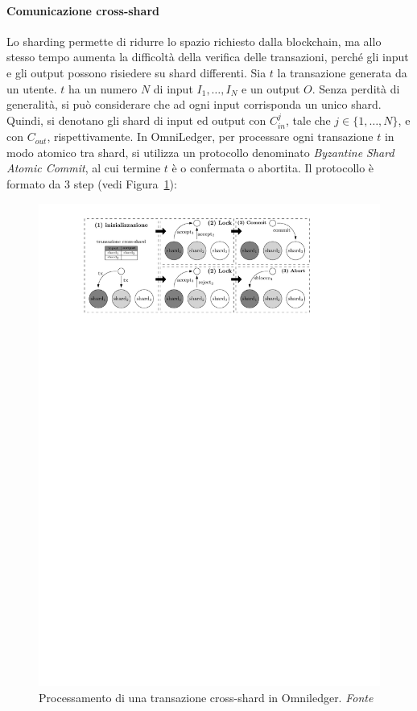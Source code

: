\paragraph*{Comunicazione cross-shard}
Lo sharding permette di ridurre lo spazio richiesto dalla blockchain, ma allo stesso tempo aumenta la difficoltà della verifica delle transazioni, perché gli input e gli output possono risiedere su shard differenti. Sia $t$ la transazione generata da un utente. $t$ ha un numero $N$ di input $I_1, \dots, I_N$ e un output $O$. Senza perdità di generalità, si può considerare che ad ogni input corrisponda un unico shard. Quindi, si denotano gli shard di input ed output con $C_{in}^j$, tale che $j \in \{1, \dots, N\}$, e con $C_{out}$, rispettivamente. 
In OmniLedger, per processare ogni transazione $t$ in modo atomico tra shard, si utilizza un protocollo denominato \emph{Byzantine Shard Atomic Commit}, al cui termine $t$ è o confermata o abortita. Il protocollo è formato da 3 step (vedi Figura~\ref{fig:atomix}):

\begin{figure}
	\centering
	\includegraphics[scale=0.9]{img/capdue/atomix.pdf}
	\caption{Processamento di una transazione cross-shard in Omniledger. \emph{Fonte~\cite{kokoris2018omniledger}}}
	\label{fig:atomix}
\end{figure}

